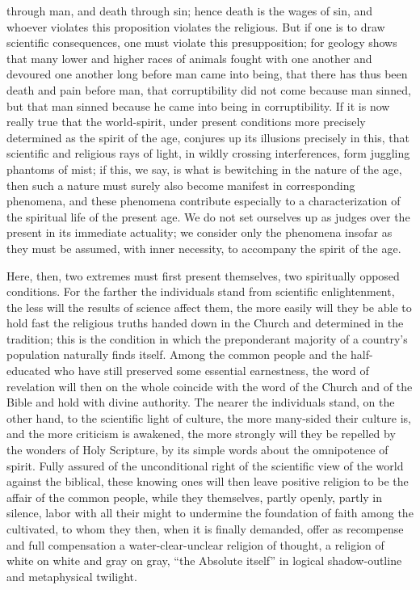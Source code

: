 \documentclass[12pt]{book}
\newcommand{\opage}[1]{\marginnote{\footnotesize\textit{[#1]}}}
\begin{document}
through man, and death through sin; hence death is the wages of sin, and
whoever violates this proposition violates the religious. But if one is
to draw scientific consequences, one must violate this presupposition;
for geology shows that many lower
\opage{70}\setcounter{footnote}{0}%
and higher races of animals fought with one another and devoured one
another long before man came into being, that there has thus been death
and pain before man, that corruptibility did not come because man
sinned, but that man sinned because he came into being in
corruptibility.
If it is now really true that the world-spirit, under present conditions
more precisely determined as the spirit of the age, conjures up its
illusions precisely in this, that scientific and religious rays of
light, in wildly crossing interferences, form juggling phantoms of mist;
if this, we say, is what is bewitching in the nature of the age, then
such a nature must surely also become manifest in corresponding
phenomena, and these phenomena contribute especially to a
characterization of the spiritual life of the present age. We do not
set ourselves up as judges over the present in its immediate actuality;
we consider only the phenomena insofar as they must be assumed, with
inner necessity, to accompany the spirit of the age.

Here, then, two extremes must first present themselves, two spiritually
opposed conditions. For the farther the individuals stand from
scientific enlightenment, the less will the results of science affect
them, the more easily will they be able to hold fast the religious
truths handed down in the Church and determined in the tradition; this
is the condition in which the preponderant majority of a country's
population naturally finds itself. Among the common people and the
half-educated who have still preserved some essential earnestness, the
word of revelation will then on the whole coincide with the word of the
Church and of the Bible and hold with divine authority. The nearer the
individuals stand, on the other hand, to the scientific light of
culture, the more many-sided their culture is, and the more criticism is
awakened, the more strongly will they be repelled by the wonders of Holy
Scripture, by its simple words about the omnipotence of spirit. Fully
assured of the
\opage{71}\setcounter{footnote}{0}%
unconditional right of the scientific view of the world against the
biblical, these knowing ones will then leave positive religion to be the
affair of the common people, while they themselves, partly openly,
partly in silence, labor with all their might to undermine the
foundation of faith among the cultivated, to whom they then, when it is
finally demanded, offer as recompense and full compensation a
water-clear-unclear religion of thought, a religion of white on white
and gray on gray, ``the Absolute itself'' in logical shadow-outline and
metaphysical twilight.
\end{document}
